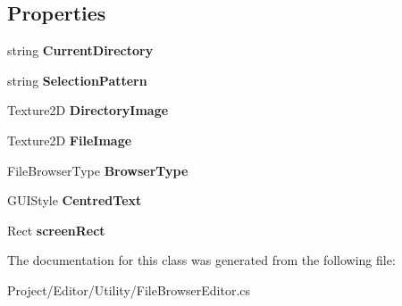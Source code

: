 \subsection*{Properties}
\begin{DoxyCompactItemize}
\item 
\mbox{\label{class_lerp2_a_p_i_editor_1_1_utility_1_1_file_browser_editor_a9580d77b6a46cfb5978fe22a34e33b30}} 
string {\bfseries Current\+Directory}
\item 
\mbox{\label{class_lerp2_a_p_i_editor_1_1_utility_1_1_file_browser_editor_a3a12ddbbcb1313b97cb483d43cf6e83c}} 
string {\bfseries Selection\+Pattern}
\item 
\mbox{\label{class_lerp2_a_p_i_editor_1_1_utility_1_1_file_browser_editor_a4eb7d3588a623916433e799d1be77cf1}} 
Texture2D {\bfseries Directory\+Image}
\item 
\mbox{\label{class_lerp2_a_p_i_editor_1_1_utility_1_1_file_browser_editor_a86df058454c404ca0aeb7fe8fd195e87}} 
Texture2D {\bfseries File\+Image}
\item 
\mbox{\label{class_lerp2_a_p_i_editor_1_1_utility_1_1_file_browser_editor_a4e5169dc722f5cbc76085eb86f4a4947}} 
File\+Browser\+Type {\bfseries Browser\+Type}
\item 
\mbox{\label{class_lerp2_a_p_i_editor_1_1_utility_1_1_file_browser_editor_ac6b9e17ae8d7d078f14dfeda35e6059f}} 
G\+U\+I\+Style {\bfseries Centred\+Text}
\item 
\mbox{\label{class_lerp2_a_p_i_editor_1_1_utility_1_1_file_browser_editor_a5c611b6c9fa7f3a937ce9ebe2472e2e7}} 
Rect {\bfseries screen\+Rect}
\end{DoxyCompactItemize}


The documentation for this class was generated from the following file\+:\begin{DoxyCompactItemize}
\item 
Project/\+Editor/\+Utility/File\+Browser\+Editor.\+cs\end{DoxyCompactItemize}
